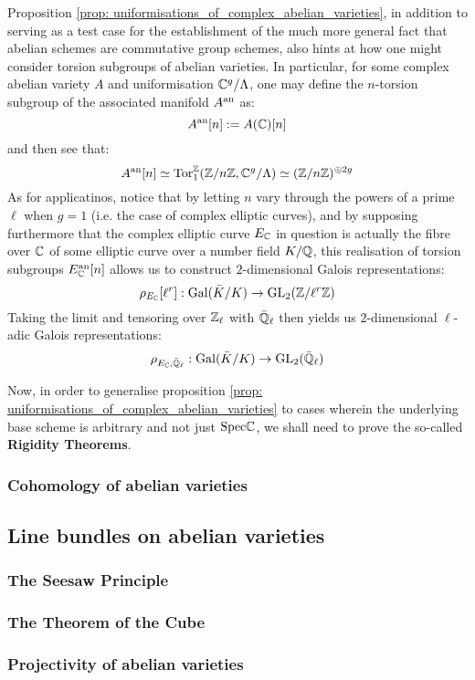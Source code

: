             \begin{remark}
                Proposition \ref{prop: uniformisations_of_complex_abelian_varieties}, in addition to serving as a test case for the establishment of the much more general fact that abelian schemes are commutative group schemes, also hints at how one might consider torsion subgroups of abelian varieties. In particular, for some complex abelian variety $A$ and uniformisation $\mathbb{C}^g/\Lambda$, one may define the $n$-torsion subgroup of the associated manifold $A^{\mathrm{an}}$ as:
                    $$A^{\mathrm{an}}[n] := A(\mathbb{C})[n]$$
                and then see that:
                    $$A^{\mathrm{an}}[n] \simeq \mathrm{Tor}_1^{\mathbb{Z}}(\mathbb{Z}/n\mathbb{Z}, \mathbb{C}^g/\Lambda) \simeq (\mathbb{Z}/n\mathbb{Z})^{\oplus 2g}$$
                As for applicatinos, notice that by letting $n$ vary through the powers of a prime $\ell$ when $g = 1$ (i.e. the case of complex elliptic curves), and by supposing furthermore that the complex elliptic curve $E_{\mathbb{C}}$ in question is actually the fibre over $\mathbb{C}$ of some elliptic curve over a number field $K/\mathbb{Q}$, this realisation of torsion subgroups $E_{\mathbb{C}}^{\mathrm{an}}[n]$ allows us to construct $2$-dimensional Galois representations:
                    $$\rho_{E_{\mathbb{C}}}[\ell^r]: \mathrm{Gal}(\bar{K}/K) \to \operatorname{GL}_2(\mathbb{Z}/\ell^r\mathbb{Z})$$
                Taking the limit and tensoring over $\mathbb{Z}_{\ell}$ with $\bar{\mathbb{Q}}_{\ell}$ then yields us $2$-dimensional $\ell$-adic Galois representations:
                    $$\rho_{E_{\mathbb{C}}, \bar{\mathbb{Q}}_{\ell}}: \mathrm{Gal}(\bar{K}/K) \to \operatorname{GL}_2(\bar{\mathbb{Q}}_{\ell})$$
            \end{remark}
            
            Now, in order to generalise proposition \ref{prop: uniformisations_of_complex_abelian_varieties} to cases wherein the underlying base scheme is arbitrary and not just $\mathrm{Spec} \mathbb{C}$, we shall need to prove the so-called \textbf{Rigidity Theorems}.
        
        \subsubsection{Cohomology of abelian varieties}
        
    \subsection{Line bundles on abelian varieties}
        \subsubsection{The Seesaw Principle}
        
        \subsubsection{The Theorem of the Cube}
        
        \subsubsection{Projectivity of abelian varieties}
